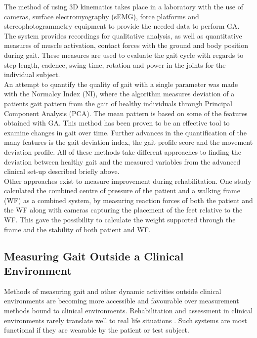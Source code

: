 The method of using 3D kinematics takes place in a laboratory with the use of cameras, surface electromyography (sEMG), force platforms and stereophotogrammetry equipment to provide the needed data to perform GA. The system provides recordings for qualitative analysis, as well as quantitative measures of muscle activation, contact forces with the ground and body position during gait. These measures are used to evaluate the gait cycle with regards to step length, cadence, swing time, rotation and power in the joints for the individual subject. \cite{Sandrini2018}\\
An attempt to quantify the quality of gait with a single parameter was made with the Normalcy Index (NI), where the algorithm measures deviation of a patients gait pattern from the gait of healthy individuals through Principal Component Analysis (PCA). The mean pattern is based on some of the features obtained with GA. This method has been proven to be an effective tool to examine changes in gait over time. \cite{Sandrini2018}
Further advances in the quantification of the many features is the gait deviation index, the gait profile score and the movement deviation profile. All of these methods take different approaches to finding the deviation between healthy gait and the measured variables from the advanced clinical set-up described briefly above. \cite{Sandrini2018}\\
Other approaches exist to measure improvement during rehabilitation. One study calculated the combined centre of pressure of the patient and a walking frame (WF) as a combined system, by measuring reaction forces of both the patient and the WF along with cameras capturing the placement of the feet relative to the WF. This gave the possibility to calculate the weight supported through the frame and the stability of both patient and WF. \cite{Costamagna2017}

\subsection{Measuring Gait Outside a Clinical Environment}

Methods of measuring gait and other dynamic activities outside clinical environments are becoming more accessible and favourable over measurement methods bound to clinical environments. Rehabilitation and assessment in clinical environments rarely translate well to real life situations \cite{Basteris2014}. Such systems are most functional if they are wearable by the patient or test subject. 

